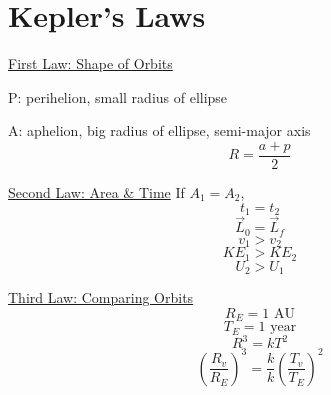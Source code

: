 \documentclass[fleqn]{article}
\begin{document}
\setlength{\mathindent}{0pt}
\section*{Kepler's Laws}
\underline{First Law: Shape of Orbits}

P: perihelion, small radius of ellipse

A: aphelion, big radius of ellipse, semi-major axis
\[ R=\frac{a+p}{2}  \]

\underline{Second Law: Area \& Time}
If $A_1=A_2$,
\[ t_1=t_2 \]
\[ \vec{L}_{0}  = \vec{L}_{f}    \]
\[ v_1 > v_2 \]
\[ KE_1 > KE_2 \]
\[ U_2 > U_1 \]

\underline{Third Law: Comparing Orbits}
\[ R_E = 1 \text{ AU}  \]
\[ T_E = 1 \text{ year}  \]
\[ R^3 = kT^2 \]
\[ \left( \frac{R_v}{R_E} \right)^3 = \frac{k}{k} \left( \frac{T_v}{T_E}  \right)^2 \]
\end{document}
